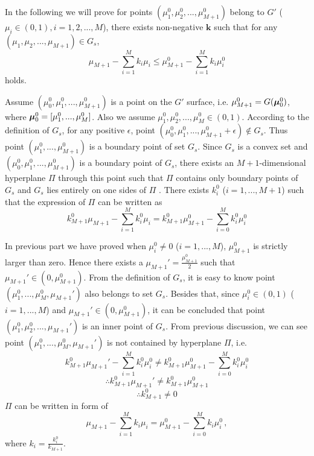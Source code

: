 In the following we will prove for points $(\mu_1^0, \mu_2^0, ..., \mu_{M+1}^0)$ belong to $G'$ ($\mu_i \in (0, 1), i = 1, 2, ..., M$), there exists non-negative $\mathbf{k}$ such that for any $(\mu_1, \mu_2, ..., \mu_{M+1}) \in G_s$, 
\[
\mu_{M+1} - \sum_{i=1}^{M}k_i\mu_i \leq \mu_{M+1}^0 - \sum_{i=1}^{M}k_i\mu_i^0
\]
holds. 

Assume $(\mu_0^0, \mu_1^0, ..., \mu_{M+1}^0)$ is a point on the $G'$ surface, i.e. $\mu_{M+1}^0 = G(\boldsymbol{\mu}_0^0)$, where $\boldsymbol{\mu}_0^0 = [\mu_1^0, ..., \mu_{M}^0]$. 
Also we assume $\mu_1^0, \mu_2^0, ..., \mu_M^0 \in (0, 1)$. 
According to the definition of $G_s$, for any positive $\epsilon$, point $(\mu_0^0, \mu_1^0, ..., \mu_{M+1}^0+\epsilon) \notin G_s$. Thus point $(\mu_1^0, ..., \mu_{M+1}^0)$ is a boundary point of set $G_s$.  
Since $G_s$ is a convex set and $(\mu_0^0, \mu_1^0, ..., \mu_{M+1}^0)$ is a boundary point of $G_s$,  
there exists an $M+1$-dimensional hyperplane $\Pi$ through this point such that $\Pi$ contains only boundary points of $G_s$ and $G_s$ lies entirely on one sides of $\Pi$  \cite{dantzig1951fundamental}. 
 There exists $k_i^0$ ($i=1, ..., M+1$) such that the expression of $\Pi$ can be written as
\begin{equation}
\label{PI}
k_{M+1}^0\mu_{M+1} - \sum_{i=1}^{M}k_i^0\mu_i = k_{M+1}^0\mu_{M+1}^0 - \sum_{i=0}^{M}k_i^0\mu_i^0
\end{equation}

In previous part we have proved when $\mu^0_i\neq 0$ ($i=1, ..., M$), $\mu_{M+1}^0 $ is strictly larger than zero. Hence there exists a $\mu_{M+1}' = \frac{\mu_{M+1}^0}{2}$ such that $\mu_{M+1}' \in (0, \mu_{M+1}^0)$. From the definition of $G_s$, it is easy to know point $(\mu^0_1, ..., \mu^0_M, \mu_{M+1}')$ also belongs to set $G_s$. Besides that, since $\mu^0_i \in (0, 1)$ ($i=1, ..., M$) and $\mu_{M+1}' \in (0, \mu_{M+1}^0)$, it can be concluded that point $(\mu_1^0, \mu_2^0, ..., \mu_{M+1}')$ is an inner point of $G_s$.
From previous discussion, we can see point $(\mu^0_1, ..., \mu^0_M, \mu_{M+1}')$ is not contained by hyperplane $\Pi$, i.e.
\[
k_{M+1}^0\mu_{M+1}' - \sum_{i=1}^{M}k_i^0\mu_i^0 \neq k_{M+1}^0\mu_{M+1}^0 - \sum_{i=0}^{M}k_i^0\mu_i^0
\]
\[
\therefore k_{M+1}^0\mu_{M+1}' \neq k_{M+1}^0\mu_{M+1}^0
\]
\[
\therefore k_{M+1}^0 \neq 0
\]
 $\Pi$ can be written in form of 
\begin{equation}
\label{PI2}
\mu_{M+1} - \sum_{i=1}^{M}k_i\mu_i = \mu_{M+1}^0 - \sum_{i=0}^{M}k_i\mu_i^0\,,
\end{equation}
where $k_i = \frac{k_i^0}{k_{M+1}}$. 


